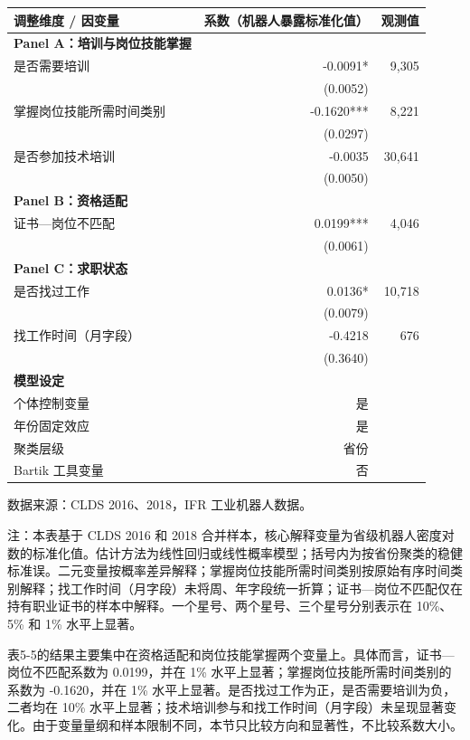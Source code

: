 \documentclass[UTF8, zihao=-4, a4paper, openany, fontset=none]{ctexrep}
\newcounter{none}
\numberwithin{equation}{chapter}
\begin{document}
{\def\LTcaptype{none} %
\begin{longtable}[]{@{}lrr@{}}
\toprule\noalign{}
调整维度 / 因变量 & 系数（机器人暴露标准化值） & 观测值 \\
\midrule\noalign{}
\endhead
\bottomrule\noalign{}
\endlastfoot
\textbf{Panel A：培训与岗位技能掌握} & & \\
是否需要培训 & -0.0091* & 9,305 \\
& (0.0052) & \\
掌握岗位技能所需时间类别 & -0.1620*** & 8,221 \\
& (0.0297) & \\
是否参加技术培训 & -0.0035 & 30,641 \\
& (0.0050) & \\
\textbf{Panel B：资格适配} & & \\
证书---岗位不匹配 & 0.0199*** & 4,046 \\
& (0.0061) & \\
\textbf{Panel C：求职状态} & & \\
是否找过工作 & 0.0136* & 10,718 \\
& (0.0079) & \\
找工作时间（月字段） & -0.4218 & 676 \\
& (0.3640) & \\
\textbf{模型设定} & & \\
个体控制变量 & 是 & \\
年份固定效应 & 是 & \\
聚类层级 & 省份 & \\
Bartik 工具变量 & 否 & \\
\end{longtable}
}

数据来源：CLDS 2016、2018，IFR 工业机器人数据。

注：本表基于 CLDS 2016 和 2018 合并样本，核心解释变量为省级机器人密度对数的标准化值。估计方法为线性回归或线性概率模型；括号内为按省份聚类的稳健标准误。二元变量按概率差异解释；掌握岗位技能所需时间类别按原始有序时间类别解释；找工作时间（月字段）未将周、年字段统一折算；证书---岗位不匹配仅在持有职业证书的样本中解释。一个星号、两个星号、三个星号分别表示在 10\%、5\% 和 1\% 水平上显著。

表5-5的结果主要集中在资格适配和岗位技能掌握两个变量上。具体而言，证书---岗位不匹配系数为 0.0199，并在 1\% 水平上显著；掌握岗位技能所需时间类别的系数为 -0.1620，并在 1\% 水平上显著。是否找过工作为正，是否需要培训为负，二者均在 10\% 水平上显著；技术培训参与和找工作时间（月字段）未呈现显著变化。由于变量量纲和样本限制不同，本节只比较方向和显著性，不比较系数大小。
\end{document}
